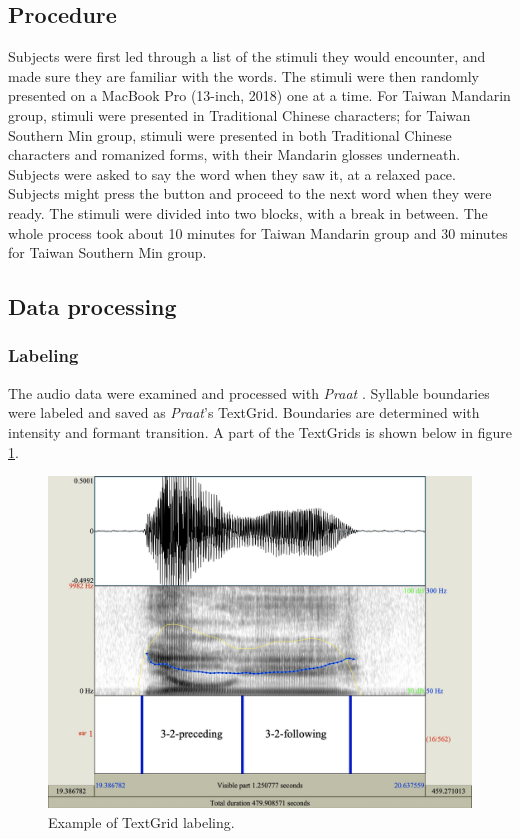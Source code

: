 \documentclass[12pt]{report}
\begin{document}
\begin{CJK}{UTF8}{bsmi}
\subsection{Procedure}
Subjects were first led through a list of the stimuli they would encounter, and made sure they are familiar with the words. The stimuli were then randomly presented on a MacBook Pro (13-inch, 2018) one at a time. For Taiwan Mandarin group, stimuli were presented in Traditional Chinese characters; for Taiwan Southern Min group, stimuli were presented in both Traditional Chinese characters and romanized forms, with their Mandarin glosses underneath. Subjects were asked to say the word when they saw it, at a relaxed pace. Subjects might press the button and proceed to the next word when they were ready. The stimuli were divided into two blocks, with a break in between. The whole process took about 10 minutes for Taiwan Mandarin group and 30 minutes for Taiwan Southern Min group.

\subsection{Data processing}
\subsubsection{Labeling}
The audio data were examined and processed with \textit{Praat} \citep{BoersmaWeenink2018}. Syllable boundaries were labeled and saved as \textit{Praat}’s TextGrid. Boundaries are determined with intensity and formant transition. A part of the TextGrids is shown below in figure \ref{Figure:TextGridExample}.

\begin{figure}[hbt!]
\centering
\includegraphics[scale=.45]{Figures/E1/TextGridExample.jpg}
\caption{Example of TextGrid labeling.}
\label{Figure:TextGridExample}
\end{figure}


\end{CJK}
\end{document}
